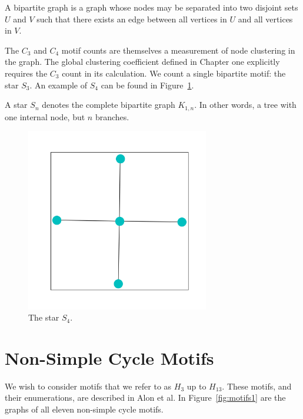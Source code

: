 \begin{dfn}
    A bipartite graph is a graph whose nodes may be separated into two disjoint sets $U$ and $V$
    such that there exists an edge between all vertices in $U$ and all vertices in $V$.
\end{dfn}

The $C_{3}$ and $C_{4}$ motif counts are themselves a measurement of node clustering in the graph. The
global clustering coefficient defined in Chapter one explicitly requires the $C_{3}$ count in its 
calculation. We count a single bipartite motif: the star $S_3$.
An example of $S_4$ can be found in Figure~\ref{fig:star}.

\begin{dfn}
    A star $S_n$ denotes the complete bipartite graph $K_{1,n}$. In other words, 
    a tree with one internal node, but $n$ branches.
\end{dfn}

\FloatBarrier

\begin{figure}[h!]
    \includegraphics[width=8cm]{Images/Star.png}
    \centering
    \caption{The star $S_4$. \label{fig:star}}
\end{figure}

\newpage

\section{Non-Simple Cycle Motifs}
\label{section:Non-simple Motifs}
We wish to consider motifs that we refer to as $H_{3}$ up to $H_{13}$.
These motifs, and their enumerations, are described in Alon et al.\cite{alon} In Figure~\ref{fig:motifs1}
are the graphs of all eleven non-simple cycle motifs.

